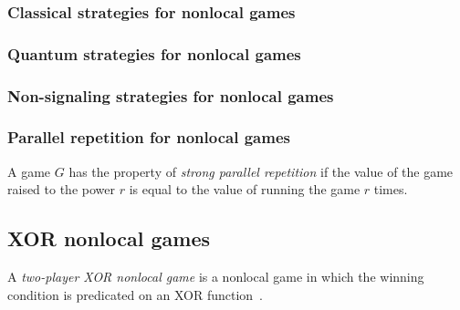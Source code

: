 \documentclass[nofootinbib,superscriptaddress,a4paper,twocolumn,longbibliography,floatfix,pra]{revtex4-2}
\begin{document}
\subsubsection{Classical strategies for nonlocal games}
\label{sec:classical_strategies_for_nonlocal_games}

\subsubsection{Quantum strategies for nonlocal games}
\label{sec:quantum_strategies_for_nonlocal_games}

\subsubsection{Non-signaling strategies for nonlocal games}
\label{sec:non_signaling_strategies_for_nonlocal_games}

\subsubsection{Parallel repetition for nonlocal games}
\label{sec:parallel_repeptitionfor_nonlocal_games}

A game $G$ has the property of \emph{strong parallel repetition} if the value
of the game raised to the power $r$ is equal to the value of running the game
$r$ times.

\subsection{XOR nonlocal games}
\label{sec:xor_nonlocal_games}

A \emph{two-player XOR nonlocal game} is a nonlocal game in which the winning
condition is predicated on an XOR function~\cite{cleve2004consequences}.
\end{document}
